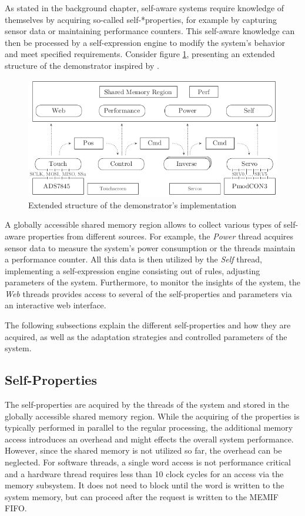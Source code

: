 As stated in the background chapter, self-aware systems require knowledge of
themselves by acquiring so-called self-*properties, for example by capturing
sensor data or maintaining performance counters. This self-aware knowledge can
then be processed by a self-expression engine to modify the system's behavior
and meet specified requirements. Consider figure \ref{fig:demo_selfaware},
presenting an extended structure of the demonstrator inspired by
\citep{AHL14}.
\begin{figure}
	\centering
	\includegraphics{../figures/demo_selfaware}
	\caption{Extended structure of the demonstrator's implementation}
	\label{fig:demo_selfaware}
\end{figure}
A globally accessible shared memory region allows to collect various types of
self-aware properties from different sources. For example, the \emph{Power}
thread acquires sensor data to measure the system's power consumption or the
threads maintain a performance counter. All this data is then utilized by the
\emph{Self} thread, implementing a self-expression engine consisting out of
rules, adjusting parameters of the system. Furthermore, to monitor the
insights of the system, the \emph{Web} threads provides access to several of
the self-properties and parameters via an interactive web interface.

The following subsections explain the different self-properties and how they
are acquired, as well as the adaptation strategies and controlled parameters
of the system.

\subsection{Self-Properties}

The self-properties are acquired by the threads of the system and stored in
the globally accessible shared memory region. While the acquiring of the
properties is typically performed in parallel to the regular processing, the
additional memory access introduces an overhead and might effects the overall
system performance. However, since the shared memory is not utilized so far,
the overhead can be neglected. For software threads, a single word access is
not performance critical and a hardware thread requires less than 10 clock
cycles for an access via the memory subsystem. It does not need to block until
the word is written to the system memory, but can proceed after the request is
written to the \ac{MEMIF} \ac{FIFO}.

